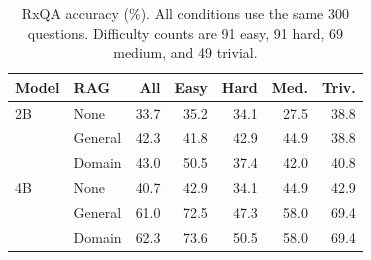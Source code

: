 \begin{table}[t]
\centering
\small
\setlength{\tabcolsep}{3pt}
\begin{tabular}{llrrrrr}
\toprule
Model & RAG & All & Easy & Hard & Med. & Triv. \\
\midrule
2B & None & 33.7 & 35.2 & 34.1 & 27.5 & 38.8 \\
 & General & 42.3 & 41.8 & 42.9 & 44.9 & 38.8 \\
 & Domain & 43.0 & 50.5 & 37.4 & 42.0 & 40.8 \\
\midrule
4B & None & 40.7 & 42.9 & 34.1 & 44.9 & 42.9 \\
 & General & 61.0 & 72.5 & 47.3 & 58.0 & 69.4 \\
 & Domain & 62.3 & 73.6 & 50.5 & 58.0 & 69.4 \\
\bottomrule
\end{tabular}
\caption{RxQA accuracy (\%). All conditions use the same 300 questions. Difficulty counts are 91 easy, 91 hard, 69 medium, and 49 trivial.}
\label{tab:rxqa}
\end{table}

